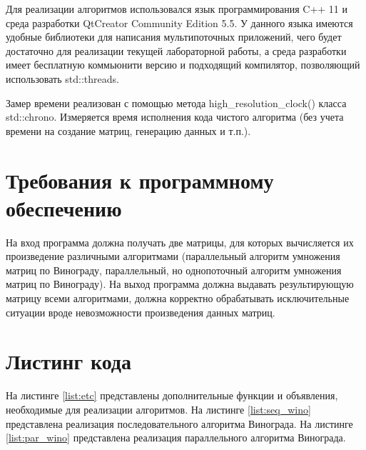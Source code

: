 \documentclass[a4paper,12pt]{report}
\begin{document}
			Для реализации алгоритмов использовался язык программирования C++ 11 и среда разработки QtCreator Community Edition 5.5. 
			У данного языка имеются удобные библиотеки для написания мультипоточных приложений, чего будет достаточно для реализации текущей лабораторной работы, а среда разработки имеет бесплатную коммьюнити версию и подходящий компилятор, позволяющий использовать std::threads.
			
			Замер времени реализован с помощью метода high\_resolution\_clock() класса std::chrono.
			Измеряется время исполнения кода чистого алгоритма (без учета времени на создание матриц, генерацию данных и т.п.).\\
		
	\section{Требования к программному обеспечению}

			На вход программа должна получать две матрицы, для которых вычисляется их произведение различными алгоритмами (параллельный алгоритм умножения матриц по Винограду, параллельный, но однопоточный алгоритм умножения матриц по Винограду). 
			На выход программа должна выдавать результирующую матрицу всеми алгоритмами, должна корректно обрабатывать исключительные ситуации вроде невозможности произведения данных матриц.

	\section{Листинг кода}

        	На листинге \ref{list:etc} представлены дополнительные функции и объявления, необходимые для реализации алгоритмов.
        	На листинге \ref{list:seq_wino} представлена реализация последовательного алгоритма Винограда.
        	На листинге \ref{list:par_wino} представлена реализация параллельного алгоритма Винограда.
        	
\end{document}
